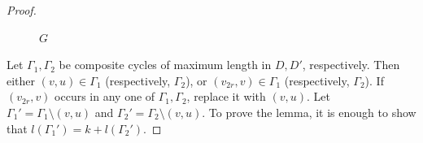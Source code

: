 \documentclass[10pt,a4paper]{amsart}
\numberwithin{equation}{section}
\begin{document}
\begin{proof}
\begin{figure}[H]
		\caption{$G$}
	\end{figure}
	Let $\Gamma_1, \Gamma_2$ be composite cycles of maximum length in $D, D'$, respectively. Then either $(v,u) \in \Gamma_1$ (respectively, $\Gamma_2$), or $(v_{2r},v) \in \Gamma_1$ (respectively, $\Gamma_2$). If $(v_{2r},v)$ occurs in any one of $\Gamma_1, \Gamma_2$, replace it with $(v,u)$. Let $\Gamma_1'=\Gamma_1\setminus(v,u)$ and $\Gamma_2'=\Gamma_2\setminus(v,u)$. To prove the lemma, it is enough to show that $l(\Gamma_1')=k+l(\Gamma_2')$.  
	
	
	
	
	
	

\end{proof}
\end{document}

